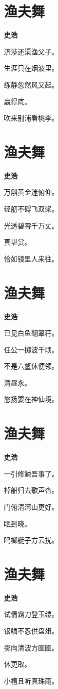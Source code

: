 \documentclass[12pt,a4paper]{ctexbook}
\begin{document}
\section{渔夫舞}
\textbf{史浩}\par\vspace{0.5em}
济涉还渠渔父子。\par
生涯只在烟波里。\par
练静忽然风又起。\par
赢得底。\par
吹来别浦看桃李。\par

\section{渔夫舞}
\textbf{史浩}\par\vspace{0.5em}
万斛黄金迷俯仰。\par
轻舠不碍飞双桨。\par
光透碧霄千万丈。\par
真堪赏。\par
恰如镜里人来往。\par

\section{渔夫舞}
\textbf{史浩}\par\vspace{0.5em}
已见白鱼翻翠荇。\par
任公一掷波千顷。\par
不是六鳌休便领。\par
清昼永。\par
悠扬要在神仙境。\par

\section{渔夫舞}
\textbf{史浩}\par\vspace{0.5em}
一引修鳞吾事了。\par
棹船归去歌声杳。\par
门俯清湾山更好。\par
眠到晓。\par
鸣榔艇子方云扰。\par

\section{渔夫舞}
\textbf{史浩}\par\vspace{0.5em}
试倩霜刀登玉缕。\par
银鳞不忍供盘俎。\par
掷向清波方圉圉。\par
休更取。\par
小槽且听真珠雨。\par
\end{document}
